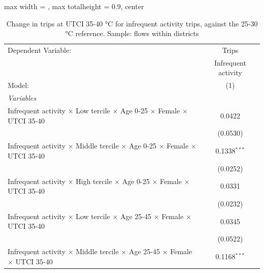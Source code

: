 
\begin{table}[htbp]
   \caption{\label{table_intersectionality_infrequent_activity_35-40} Change in trips at UTCI 35-40 °C for infrequent activity trips, against the 25-30 °C reference. Sample: flows within districts}
   \centering
   \small
   \begin{adjustbox}{max width = \textwidth, max totalheight = 0.9\textheight, center}
      \begin{tabular}{lc}
         \tabularnewline \midrule \midrule
         Dependent Variable:                                                                                     & Trips\\  
                                                                                                                 & Infrequent activity \\   
         Model:                                                                                                  & (1)\\  
         \midrule
         \emph{Variables}\\
         Infrequent activity $\times$ Low tercile $\times$ Age 0-25 $\times$ Female $\times$ UTCI 35-40          & 0.0422\\   
                                                                                                                 & (0.0530)\\   
         Infrequent activity $\times$ Middle tercile $\times$ Age 0-25 $\times$ Female $\times$ UTCI 35-40       & 0.1338$^{***}$\\   
                                                                                                                 & (0.0252)\\   
         Infrequent activity $\times$ High tercile $\times$ Age 0-25 $\times$ Female $\times$ UTCI 35-40         & 0.0331\\   
                                                                                                                 & (0.0232)\\   
         Infrequent activity $\times$ Low tercile $\times$ Age 25-45 $\times$ Female $\times$ UTCI 35-40         & 0.0345\\   
                                                                                                                 & (0.0522)\\   
         Infrequent activity $\times$ Middle tercile $\times$ Age 25-45 $\times$ Female $\times$ UTCI 35-40      & 0.1168$^{***}$\\   

\end{tabular}
\end{adjustbox}
\end{table}

